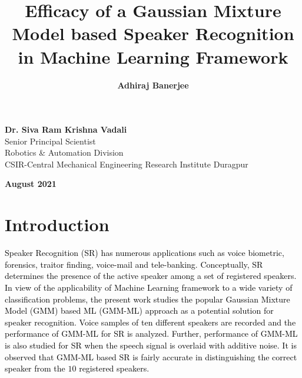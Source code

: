 \documentclass{article}
\title{\textbf{Efficacy of a Gaussian Mixture Model based Speaker Recognition in Machine Learning Framework}}
\author{\textbf{Adhiraj Banerjee}}
\begin{document}
\vspace{-3em}
\maketitle
\thispagestyle{empty}
\vspace{-3em}
\begin{center}{\textbf{Dr. Siva Ram Krishna Vadali}\\ Senior Principal Scientist \\ Robotics \& Automation Division\\ 
CSIR-Central Mechanical Engineering Research Institute Duragpur\\}
\end{center}
\vspace{1em}
\begin{center}{\textbf{August 2021}}
\end{center}
\newpage
\tableofcontents
\newpage
\listoffigures
\newpage
\section{\textbf{{Introduction}}}
\textcolor{black}{Speaker Recognition (SR) has numerous applications such as voice biometric, forensics, traitor finding, voice-mail and  tele-banking. Conceptually, SR determines \textcolor{black}{the presence of the active speaker} among a set of registered speakers. %
 \textcolor{black}{In view of the applicability of {Machine Learning} framework to a wide variety of classification problems, the present work studies the popular Gaussian Mixture Model (GMM) based ML (GMM-ML) approach as a potential solution for speaker recognition. Voice samples of ten different speakers are recorded and the performance of GMM-ML for SR is analyzed. Further, performance of GMM-ML is also studied for SR when the speech signal is overlaid with additive noise. It is observed that GMM-ML based SR is fairly accurate in distinguishing the correct speaker from the $10$ registered speakers.}}
\end{document}
